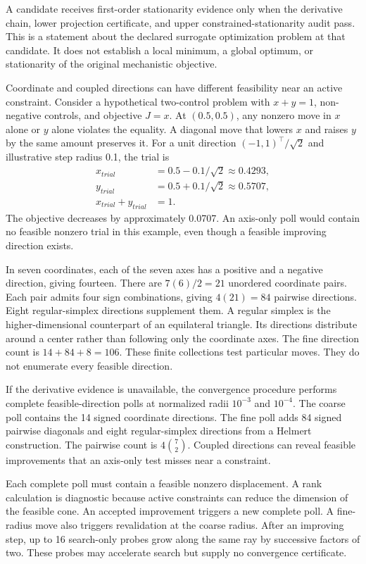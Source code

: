 A candidate receives first-order stationarity evidence only when the derivative chain, lower projection certificate, and upper constrained-stationarity audit pass. This is a statement about the declared surrogate optimization problem at that candidate. It does not establish a local minimum, a global optimum, or stationarity of the original mechanistic objective.

Coordinate and coupled directions can have different feasibility near an active constraint. Consider a hypothetical two-control problem with $x+y=1$, non-negative controls, and objective $J=x$. At $(0.5,0.5)$, any nonzero move in $x$ alone or $y$ alone violates the equality. A diagonal move that lowers $x$ and raises $y$ by the same amount preserves it. For a unit direction $(-1,1)^\top/\sqrt2$ and illustrative step radius 0.1, the trial is
\[
\begin{aligned}
x_{trial}&=0.5-0.1/\sqrt2\approx0.4293,\\
y_{trial}&=0.5+0.1/\sqrt2\approx0.5707,\\
x_{trial}+y_{trial}&=1.
\end{aligned}
\]
The objective decreases by approximately 0.0707. An axis-only poll would contain no feasible nonzero trial in this example, even though a feasible improving direction exists.

In seven coordinates, each of the seven axes has a positive and a negative direction, giving fourteen. There are $7(6)/2=21$ unordered coordinate pairs. Each pair admits four sign combinations, giving $4(21)=84$ pairwise directions. Eight regular-simplex directions supplement them. A regular simplex is the higher-dimensional counterpart of an equilateral triangle. Its directions distribute around a center rather than following only the coordinate axes. The fine direction count is $14+84+8=106$. These finite collections test particular moves. They do not enumerate every feasible direction.

If the derivative evidence is unavailable, the convergence procedure performs complete feasible-direction polls at normalized radii $10^{-3}$ and $10^{-4}$. The coarse poll contains the 14 signed coordinate directions. The fine poll adds 84 signed pairwise diagonals and eight regular-simplex directions from a Helmert construction. The pairwise count is $4\binom72$. Coupled directions can reveal feasible improvements that an axis-only test misses near a constraint.

Each complete poll must contain a feasible nonzero displacement. A rank calculation is diagnostic because active constraints can reduce the dimension of the feasible cone. An accepted improvement triggers a new complete poll. A fine-radius move also triggers revalidation at the coarse radius. After an improving step, up to 16 search-only probes grow along the same ray by successive factors of two. These probes may accelerate search but supply no convergence certificate.

